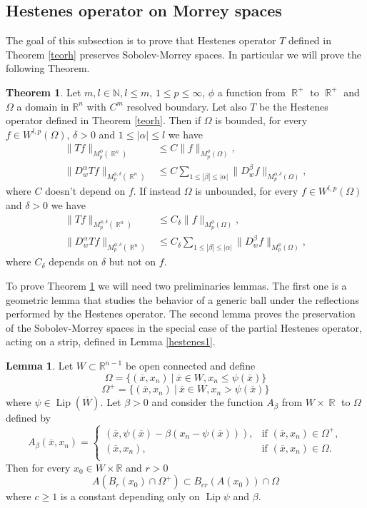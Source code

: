 \documentclass[12pt]{article}
\theoremstyle{definition}
\newtheorem{theorem}{Theorem}
\newtheorem{lemma}{Lemma}
\DeclareMathOperator\Lip{Lip}
\DeclareMathOperator\rr{\mathbb{R}}
\begin{document}
\subsection{Hestenes operator on Morrey spaces}
The goal of this subsection is to prove that Hestenes operator $T$ defined in Theorem \ref{teorh} preserves Sobolev-Morrey spaces. In particular we will prove the following Theorem.
\begin{theorem}\label{mainh}
Let $m,l \in \mathbb{N}, l\le m$, $1\le p\le\infty$, $\phi$ a function from $\rr^+$ to $\rr^+$ and $\Omega$ a domain in $\mathbb{R}^n$ with $C^m$ resolved boundary. Let also $ T$ be the Hestenes operator defined in Theorem \ref{teorh}. Then if $\Omega$ is bounded, for every $f \in W^{l,p}(\Omega)$, $\delta>0$ and $1\le |\alpha| \le l$ we have
\begin{align}
\| Tf\|_{M_p^\phi(\rr^n)} &\le    C\| f\|_{M_p^\phi(\Omega)}, \label{b0}\\
\| D^\alpha_w Tf\|_{M_p^{\phi,\delta}(\rr^n)} &\le   C\sum_{1\le |\beta|\le|\alpha| }\| D^\beta_wf\|_{M_p^{\phi,\delta}(\Omega)}, \label{bl}
\end{align}
where  $C$ doesn't depend on $f$. If instead $\Omega$ is unbounded, for every $f \in W^{l,p}(\Omega)$ and $\delta>0$ we have
\begin{align}
\| Tf\|_{M_p^{\phi,\delta}(\rr^n)} &\le    C_\delta\| f\|_{M_p^\phi(\Omega)}, \label{u0} \\
\| D^\alpha_w Tf\|_{M_p^{\phi,\delta}(\rr^n)} &\le   C_\delta\sum_{1\le |\beta|\le|\alpha| }\| D^\beta_wf\|_{M_p^\phi(\Omega)}, \label{ul}
\end{align}
where $C_\delta$ depends on $\delta$ but not on $f.$
\end{theorem}
To prove Theorem \ref{mainh} we will need two preliminaries lemmas. The first one is a geometric lemma that studies the behavior of a generic ball under the reflections performed by the Hestenes operator. The second lemma proves the preservation of the Sobolev-Morrey spaces in the special case of the partial Hestenes operator, acting on a strip, defined in Lemma \ref{hestenes1}.

\begin{lemma}\label{lcircle}
Let $W \subset \mathbb{R}^{n-1}$ be open connected and define
\[\Omega =\{ (\overline x,x_n) \ |\ \overline x\in W, x_n\le \psi(\overline x)  \} \]
\[\Omega^+ =\{ (\overline x,x_n) \ |\ \overline x\in W, x_n> \psi(\overline x)  \} \]
where $\psi \in \Lip(\overline W)$. Let $\beta>0$ and consider the function $A_\beta$ from $W \times \rr$ to $\Omega$ defined by
\[ A_\beta(\overline x, x_n) =\begin{cases}
							(\overline x , \psi(\overline x)-\beta(x_n-\psi(\overline x))), & \text{if } (\overline x, x_n) \in \Omega^+ ,\\
							(\overline x, x_n), & \text{if } (\overline x, x_n) \in \Omega .\\
\end{cases}
\]
 Then for every $x_0 \in W \times \mathbb{R}$ and $r>0$
\[ A(B_r(x_0)\cap \Omega^+)\subset B_{cr}(A(x_0))\cap \Omega\]
where $c\ge 1$ is a constant depending only on $\Lip \psi$ and $\beta$.
\end{lemma}
\end{document}
